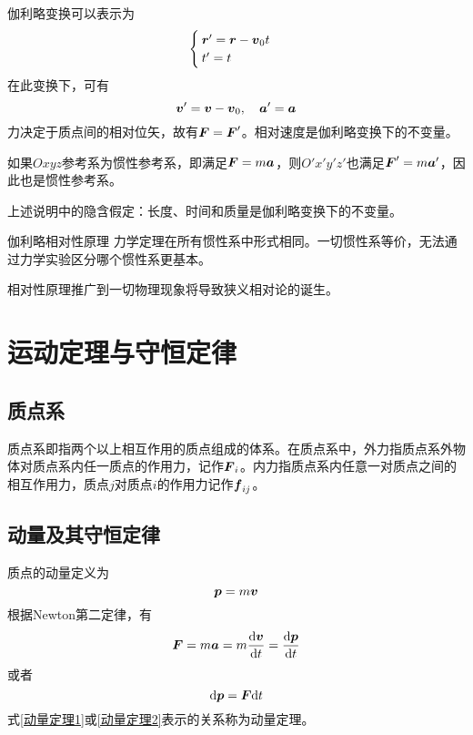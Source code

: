 伽利略变换可以表示为
\begin{equation}
	\begin{cases}
		\boldsymbol{r}' = \boldsymbol{r} - \boldsymbol{v}_0t \\
		t' = t
	\end{cases}
\end{equation}
在此变换下，可有
\begin{equation}
	\boldsymbol{v}' = \boldsymbol{v} - \boldsymbol{v}_0,\quad \boldsymbol{a}' = \boldsymbol{a}
\end{equation}
力决定于质点间的相对位矢，故有$\boldsymbol{F} = \boldsymbol{F}'$。相对速度是伽利略变换下的不变量。

如果$Oxyz$参考系为惯性参考系，即满足$\boldsymbol{F} = m\boldsymbol{a}$，则$O'x'y'z'$也满足$\boldsymbol{F}' = m\boldsymbol{a}'$，因此也是惯性参考系。

上述说明中的隐含假定：长度、时间和质量是伽利略变换下的不变量。

{\heiti 伽利略相对性原理} \quad 力学定理在所有惯性系中形式相同。一切惯性系等价，无法通过力学实验区分哪个惯性系更基本。

相对性原理推广到一切物理现象将导致狭义相对论的诞生。

\section{运动定理与守恒定律}

\subsection{质点系}

质点系即指两个以上相互作用的质点组成的体系。在质点系中，{\heiti 外力}指质点系外物体对质点系内任一质点的作用力，记作$\boldsymbol{F}_i$。{\heiti 内力}指质点系内任意一对质点之间的相互作用力，质点$j$对质点$i$的作用力记作$\boldsymbol{f}_{ij}$。

\subsection{动量及其守恒定律}

质点的{\heiti 动量}定义为
\begin{equation}
	\boldsymbol{p} = m\boldsymbol{v}
\end{equation}
根据Newton第二定律，有
\begin{equation}
	\boldsymbol{F} = m\boldsymbol{a} = m\frac{\mathrm{d} \boldsymbol{v}}{\mathrm{d} t} = \frac{\mathrm{d} \boldsymbol{p}}{\mathrm{d} t}
	\label{动量定理1}
\end{equation}
或者
\begin{equation}
	\mathrm{d} \boldsymbol{p} = \boldsymbol{F} \mathrm{d} t
	\label{动量定理2}
\end{equation}
式\eqref{动量定理1}或\eqref{动量定理2}表示的关系称为{\heiti 动量定理}。


